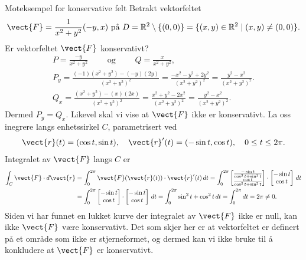 \begin{eks}{Moteksempel for konservative felt} \label{eks:moteks_konserv}
Betrakt vektorfeltet 
\[
\vect{F} = \frac{1}{x^2 + y^2}(-y, x)
\text{ på } D = \mathbb{R}^2 \setminus \{(0, 0)\} = \{(x, y) \in \mathbb{R}^2 \mid (x, y) \ne (0, 0)\}.
\]
Er vektorfeltet $\vect{F}$ konservativt?
\begin{align*}
P = \frac{-y}{x^2 + y^2} \qquad \text{ og } \qquad Q = \frac{x}{x^2 + y^2},
\\
P_y = \frac{(-1)(x^2 + y^2) - (-y)(2y)}{(x^2 + y^2)^2} 
= \frac{-x^2 - y^2 + 2y^2}{(x^2 + y^2)^2} 
= \frac{y^2 - x^2}{(x^2 + y^2)^2}.\\
Q_x = \frac{(x^2 + y^2) - (x)(2x)}{(x^2 + y^2)^2} 
= \frac{x^2 + y^2 - 2x^2}{(x^2 + y^2)^2} 
= \frac{y^2 - x^2}{(x^2 + y^2)^2}.
\end{align*}
Dermed $P_y = Q_x$. Likevel skal vi vise at $\vect{F}$ ikke er konservativt. La oss inegrere langs enhetssirkel $C$, parametrisert ved
\[
\vect{r}(t) = (\cos t, \sin t), 
\quad \vect{r}'(t) = (-\sin t, \cos t), \quad 0 \leq t \leq 2\pi.
\]
Integralet av $\vect{F}$ langs $C$ er
\begin{align*}
\int_C \vect{F} \cdot d\vect{r} &= 
\int_0^{2\pi} \vect{F}(\vect{r}(t)) \cdot \vect{r}'(t)\, dt
= \int_0^{2\pi} 
\begin{bmatrix}
\frac{-\sin t}{\cos^2 t + \sin^2 t}\\
\frac{\cos t}{\cos^2 t + \sin^2 t}
\end{bmatrix}
\cdot \begin{bmatrix}-\sin t\\ \cos t\end{bmatrix}\, dt
\\
&= \int_0^{2\pi} \begin{bmatrix}-\sin t\\ \cos t\end{bmatrix} \cdot \begin{bmatrix}-\sin t\\ \cos t\end{bmatrix}\, dt 
= \int_0^{2\pi} \sin^2 t + \cos^2 t\, dt 
= \int_0^{2\pi} dt 
= 2\pi \ne 0.
\end{align*}
Siden vi har funnet en lukket kurve der integralet av $\vect{F}$ ikke er null, kan ikke $\vect{F}$ være konservativt. Det som skjer her er at vektorfeltet er definert på et område som ikke er stjerneformet, og dermed kan vi ikke bruke  til å konkludere at $\vect{F}$ er konservativt.
\end{eks}

